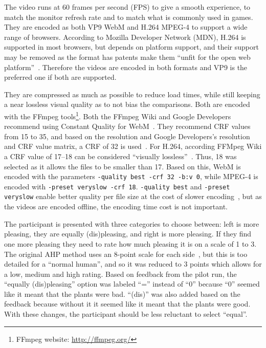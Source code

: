 The video runs at 60 frames per second (FPS) to give a smooth experience, to match the monitor refresh rate and to match what is commonly used in games.
They are encoded as both VP9 WebM and H.264 MPEG-4 to support a wide range of browsers.
According to Mozilla Developer Network (MDN), H.264 is supported in most browsers, but depends on platform support, and their support may be removed as the format has patents make them ``unfit for the open web platform''~\cite{mdn-video}.
Therefore the videos are encoded in both formats and VP9 is the preferred one if both are supported.

They are compressed as much as possible to reduce load times, while still keeping a near lossless visual quality as to not bias the comparisons.
Both are encoded with the FFmpeg tools\footnote{FFmpeg website: \url{http://ffmpeg.org/}}.
Both the FFmpeg Wiki and Google Developers recommend using Constant Quality for WebM~\cite{ffmpeg-vp9,google-vp9}.
They recommend CRF values from 15 to 35, and based on the resolution and Google Developers's resolution and CRF value matrix, a CRF of 32 is used~\cite{ffmpeg-vp9,google-vp9}.
For H.264, according FFMpeg Wiki a CRF value of 17--18 can be considered ``visually lossless''~\cite{ffmpeg-h264}.
Thus, 18 was selected as it allows the files to be smaller than 17.
Based on this, WebM is encoded with the parameters \texttt{-quality best -crf 32 -b:v 0}, while MPEG-4 is encoded with \texttt{-preset veryslow -crf 18}.
\texttt{-quality best} and \texttt{-preset veryslow} enable better quality per file size at the cost of slower encoding~\cite{ffmpeg-h264}, but as the videos are encoded offline, the encoding time cost is not important.

The participant is presented with three categories to choose between: left is more pleasing, they are equally (dis)pleasing, and right is more pleasing.
If they find one more pleasing they need to rate how much pleasing it is on a scale of 1 to 3.
The original \gls{AHP} method uses an 8-point scale for each side~\cite{2008Saaty}, but this is too detailed for a ``normal human'', %
and so it was reduced to 3 points which allows for a low, medium and high rating.
Based on feedback from the pilot run, the ``equally (dis)pleasing'' option was labeled ``='' instead of ``0'' because ``0'' seemed like it meant that the plants were bad.
``(dis)'' was also added based on the feedback because without it it seemed like it meant that the plants were good.
With these changes, the participant should be less reluctant to select ``equal''.

